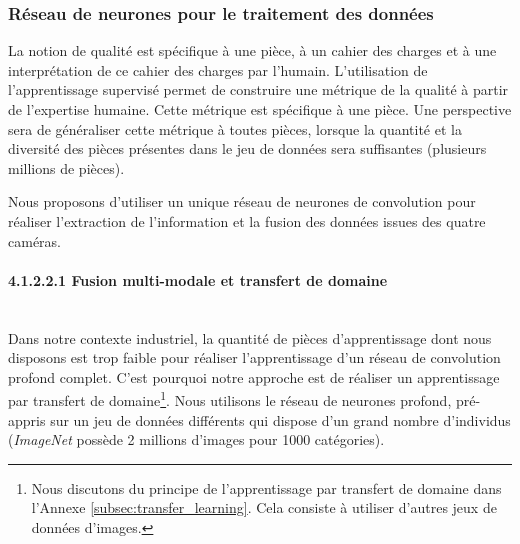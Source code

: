 \FloatBarrier
\subsubsection{Réseau de neurones pour le traitement des données} \label{neural_fusion}
La notion de qualité est spécifique à une pièce, à un cahier des charges et à une interprétation de ce cahier des charges par l’humain.
L’utilisation de l’apprentissage supervisé permet de construire une métrique de la qualité à partir de l’expertise humaine.
Cette métrique est spécifique à une pièce.
Une perspective sera de généraliser cette métrique à toutes pièces, lorsque la quantité et la diversité des pièces présentes dans le jeu de données sera suffisantes (plusieurs millions de pièces).

Nous proposons d'utiliser un unique réseau de neurones de convolution pour réaliser l'extraction de l'information et la fusion des données issues des quatre caméras.

\paragraph{4.1.2.2.1 Fusion multi-modale et transfert de domaine} \mbox{} \\
Dans notre contexte industriel, la quantité de pièces d'apprentissage dont nous disposons est trop faible pour réaliser l'apprentissage d'un réseau de convolution profond complet.
C'est pourquoi notre approche est de réaliser un apprentissage par transfert de domaine\footnote{Nous discutons du principe de l'apprentissage par transfert de domaine dans l'Annexe \ref{subsec:transfer_learning}. Cela consiste à utiliser d'autres jeux de données d'images.}.
Nous utilisons le réseau de neurones profond, pré-appris sur un jeu de données différents qui dispose d'un grand nombre d'individus (\textit{ImageNet} possède 2 millions d'images pour 1000 catégories).

